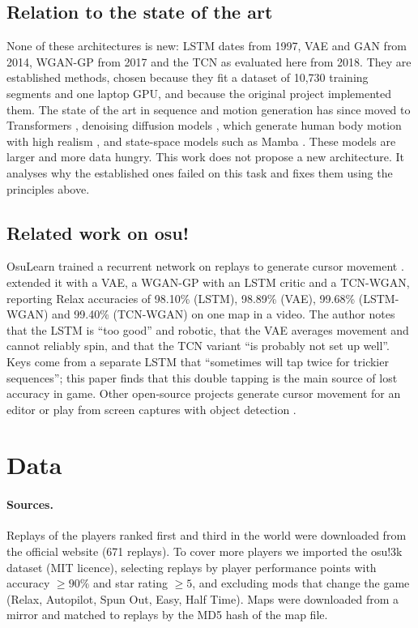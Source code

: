 \documentclass[11pt,a4paper]{article}
\begin{document}
\subsection{Relation to the state of the art}
\label{sec:frontier}
None of these architectures is new: LSTM dates from 1997, VAE and GAN from 2014, WGAN-GP from 2017 and the
TCN as evaluated here from 2018. They are established methods, chosen because they fit a dataset of
10{,}730 training segments and one laptop GPU, and because the original project implemented them. The state
of the art in sequence and motion generation has since moved to Transformers \citep{vaswani2017},
denoising diffusion models \citep{ho2020}, which generate human body motion with high realism
\citep{tevet2023}, and state-space models such as Mamba \citep{gu2023}. These models are larger and more data
hungry. This work does not propose a new architecture. It analyses why the established ones failed on this
task and fixes them using the principles above.

\subsection{Related work on osu!}
OsuLearn trained a recurrent network on replays to generate cursor movement \citep{osulearn}.
\citet{niooii} extended it with a VAE, a WGAN-GP with an LSTM critic and a TCN-WGAN, reporting Relax
accuracies of 98.10\% (LSTM), 98.89\% (VAE), 99.68\% (LSTM-WGAN) and 99.40\% (TCN-WGAN) on one map in a video.
The author notes that the LSTM is ``too good'' and robotic, that the VAE averages movement and cannot reliably
spin, and that the TCN variant ``is probably not set up well''. Keys come from a separate LSTM that
``sometimes will tap twice for trickier sequences''; this paper finds that this double tapping is the main
source of lost accuracy in game. Other open-source projects generate cursor movement for an editor
\citep{osucad} or play from screen captures with object detection \citep{autosu}.

\section{Data}
\paragraph{Sources.} Replays of the players ranked first and third in the world were downloaded from the
official website (671 replays). To cover more players we imported the osu!3k dataset \citep{osu3k} (MIT
licence), selecting replays by player performance points with accuracy $\ge 90\%$ and star rating $\ge 5$,
and excluding mods that change the game (Relax, Autopilot, Spun Out, Easy, Half Time). Maps were downloaded
from a mirror and matched to replays by the MD5 hash of the map file.
\end{document}

